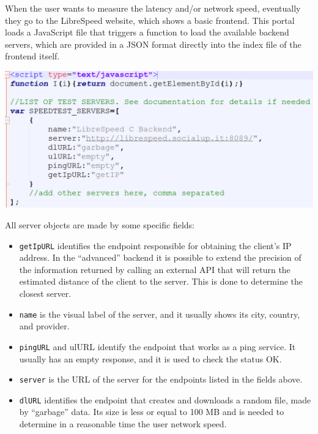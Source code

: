 \documentclass{article}
\begin{document}
When the user wants to measure the latency and/or network speed, eventually they go to the LibreSpeed website, which shows a basic frontend. This portal loads a JavaScript file that triggers a function to load the available backend servers, which are provided in a JSON format directly into the index file of the frontend itself.

\begin{center}
\begin{minipage}{12cm}
\includegraphics[width=\textwidth]{2-servers}
\end{minipage}
\end{center}
 
All server objects are made by some specific fields:
\begin{itemize}
\item \texttt{getIpURL} identifies the endpoint responsible for obtaining the client’s IP address. In the “advanced” backend it is possible to extend the precision of the information returned by calling an external API that will return the estimated distance of the client to the server. This is done to determine the closest server.
\item \texttt{name} is the visual label of the server, and it usually shows its city, country, and provider.
\item \texttt{pingURL} and ulURL identify the endpoint that works as a ping service. It usually has an empty response, and it is used to check the status OK.
\item \texttt{server} is the URL of the server for the endpoints listed in the fields above.
\item \texttt{dlURL} identifies the endpoint that creates and downloads a random file, made by “garbage” data. Its size is less or equal to 100 MB and is needed to determine in a reasonable time the user network speed.
\end{itemize}
\end{document}
